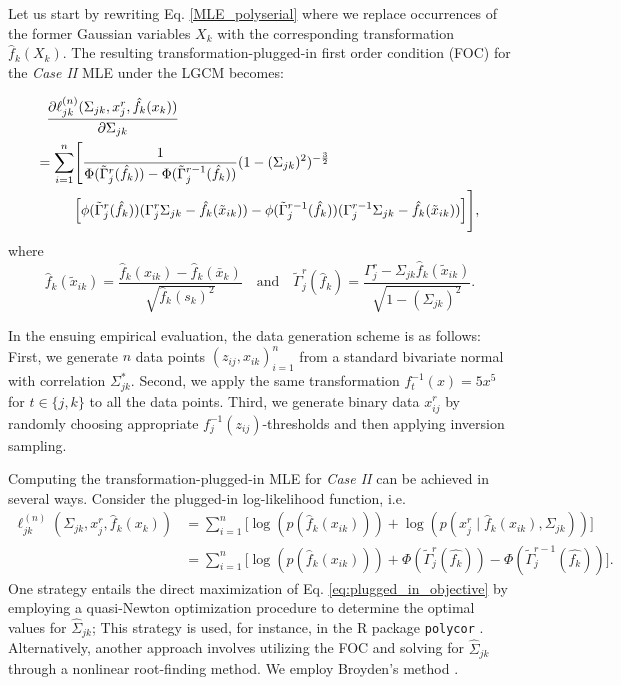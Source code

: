 Let us start by rewriting Eq. \eqref{MLE_polyserial} where we replace occurrences of the former Gaussian variables $X_k$ with the corresponding transformation $\hat{f}_k(X_k)$. The resulting transformation-plugged-in first order condition (FOC) for the \textit{Case II} MLE under the LGCM becomes:

\begin{align*}
    \MoveEqLeft \frac{\partial\ell_{jk}^{(n)}(\Sigma_{jk}, x_j^r,\hat{f_k}(x_k))}{\partial \Sigma_{jk}}                                                                                                                                 \\
    = \sum_{i=1}^n & \Bigg[\frac{1}{\Phi(\tilde{\Gamma}_j^{r}(\hat{f_k})) - \Phi(\tilde{\Gamma}_j^{r-1}(\hat{f_k}))}(1-(\Sigma_{jk})^2)^{-\frac{3}{2}}                                                                                  \\
                   & \Big[\phi({\tilde{\Gamma}}_j^{r}(\hat{f_k}))({\Gamma}_j^r\Sigma_{jk} - \hat{f_k}(\tilde{x}_{ik})) - \phi({\tilde{\Gamma}}_j^{r-1}(\hat{f_k}))({\Gamma}_j^{r-1}\Sigma_{jk} - \hat{f_k}(\tilde{x}_{ik}))\Big]\Bigg],
\end{align*}
where
\[\hat{f}_k(\tilde{x}_{ik}) = \frac{\hat{f}_k(x_{ik}) - \hat{f}_k(\bar{x}_k)}{\sqrt{\hat{f}_k(s_k)^2}} \quad \text{and} \quad {\tilde{\Gamma}}_j^{r}(\hat{f}_k) = \frac{{\Gamma}_j^{r} - \Sigma_{jk}\hat{f}_k(\tilde{x}_{ik})}{\sqrt{1-(\Sigma_{jk})^2}}.\]

In the ensuing empirical evaluation, the data generation scheme is as follows: First, we generate \(n\) data points \((z_{ij}, x_{ik})_{i=1}^n\) from a standard bivariate normal with correlation \(\Sigma^*_{jk}\). Second, we apply the same transformation \(f_t^{-1}(x) = 5x^5\) for \(t \in \{j,k\}\) to all the data points. Third, we generate binary data \(x_{ij}^r\) by randomly choosing appropriate \(f^{-1}_j(z_{ij})\)-thresholds and then applying inversion sampling.

Computing the transformation-plugged-in MLE for \textit{Case II} can be achieved in several ways. Consider the plugged-in log-likelihood function, i.e.
\begin{equation}\label{eq:plugged_in_objective}
    \begin{split}
        \ell_{jk}^{(n)}(\Sigma_{jk}, x_j^r,\hat{f}_k(x_k)) & = \sum_{i=1}^n \big[\log(p(\hat{f}_k(x_{ik}))) + \log(p(x_{j}^{r} \mid \hat{f}_k(x_{ik}), \Sigma_{jk}))\big]                      \\
        & = \sum_{i=1}^n \big[\log(p(\hat{f}_k(x_{ik}))) + \Phi(\tilde{\Gamma}_j^{r}(\hat{f_k})) - \Phi(\tilde{\Gamma}_j^{r-1}(\hat{f_k}))\big].
    \end{split}
\end{equation}
One strategy entails the direct maximization of Eq. \eqref{eq:plugged_in_objective} by employing a quasi-Newton optimization procedure to determine the optimal values for $\hat\Sigma_{jk}$; This strategy is used, for instance, in the R package \texttt{polycor} \citep{polycor2022}. Alternatively, another approach involves utilizing the FOC and solving for $\hat\Sigma_{jk}$ through a nonlinear root-finding method. We employ Broyden's method \citep{Broyden1965}.

